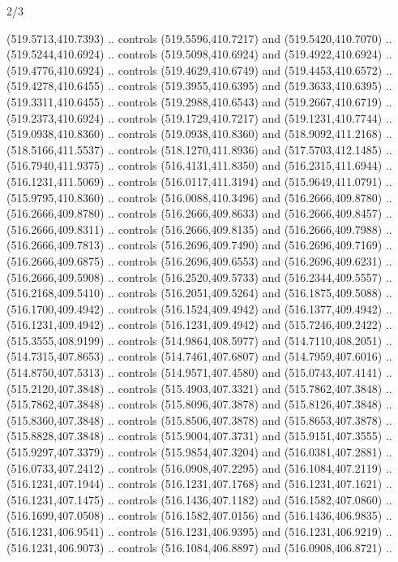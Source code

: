 \begin{flagdescription}{2/3}
\begin{scope}[xshift=0.5\flaglength,yshift=0.5\flagwidth,scale=\flagwidth/495.65]
\begin{scope}[y=0.8pt, x=0.8pt, yscale=-1,shift={(-463.76,-309.78)}]
  (519.5713,410.7393) .. controls (519.5596,410.7217) and (519.5420,410.7070) ..
  (519.5244,410.6924) .. controls (519.5098,410.6924) and (519.4922,410.6924) ..
  (519.4776,410.6924) .. controls (519.4629,410.6749) and (519.4453,410.6572) ..
  (519.4278,410.6455) .. controls (519.3955,410.6395) and (519.3633,410.6395) ..
  (519.3311,410.6455) .. controls (519.2988,410.6543) and (519.2667,410.6719) ..
  (519.2373,410.6924) .. controls (519.1729,410.7217) and (519.1231,410.7744) ..
  (519.0938,410.8360) .. controls (519.0938,410.8360) and (518.9092,411.2168) ..
  (518.5166,411.5537) .. controls (518.1270,411.8936) and (517.5703,412.1485) ..
  (516.7940,411.9375) .. controls (516.4131,411.8350) and (516.2315,411.6944) ..
  (516.1231,411.5069) .. controls (516.0117,411.3194) and (515.9649,411.0791) ..
  (515.9795,410.8360) .. controls (516.0088,410.3496) and (516.2666,409.8780) ..
  (516.2666,409.8780) .. controls (516.2666,409.8633) and (516.2666,409.8457) ..
  (516.2666,409.8311) .. controls (516.2666,409.8135) and (516.2666,409.7988) ..
  (516.2666,409.7813) .. controls (516.2696,409.7490) and (516.2696,409.7169) ..
  (516.2666,409.6875) .. controls (516.2696,409.6553) and (516.2696,409.6231) ..
  (516.2666,409.5908) .. controls (516.2520,409.5733) and (516.2344,409.5557) ..
  (516.2168,409.5410) .. controls (516.2051,409.5264) and (516.1875,409.5088) ..
  (516.1700,409.4942) .. controls (516.1524,409.4942) and (516.1377,409.4942) ..
  (516.1231,409.4942) .. controls (516.1231,409.4942) and (515.7246,409.2422) ..
  (515.3555,408.9199) .. controls (514.9864,408.5977) and (514.7110,408.2051) ..
  (514.7315,407.8653) .. controls (514.7461,407.6807) and (514.7959,407.6016) ..
  (514.8750,407.5313) .. controls (514.9571,407.4580) and (515.0743,407.4141) ..
  (515.2120,407.3848) .. controls (515.4903,407.3321) and (515.7862,407.3848) ..
  (515.7862,407.3848) .. controls (515.8096,407.3878) and (515.8126,407.3848) ..
  (515.8360,407.3848) .. controls (515.8506,407.3878) and (515.8653,407.3878) ..
  (515.8828,407.3848) .. controls (515.9004,407.3731) and (515.9151,407.3555) ..
  (515.9297,407.3379) .. controls (515.9854,407.3204) and (516.0381,407.2881) ..
  (516.0733,407.2412) .. controls (516.0908,407.2295) and (516.1084,407.2119) ..
  (516.1231,407.1944) .. controls (516.1231,407.1768) and (516.1231,407.1621) ..
  (516.1231,407.1475) .. controls (516.1436,407.1182) and (516.1582,407.0860) ..
  (516.1699,407.0508) .. controls (516.1582,407.0156) and (516.1436,406.9835) ..
  (516.1231,406.9541) .. controls (516.1231,406.9395) and (516.1231,406.9219) ..
  (516.1231,406.9073) .. controls (516.1084,406.8897) and (516.0908,406.8721) ..

\end{scope}
\end{scope}
\end{flagdescription}

